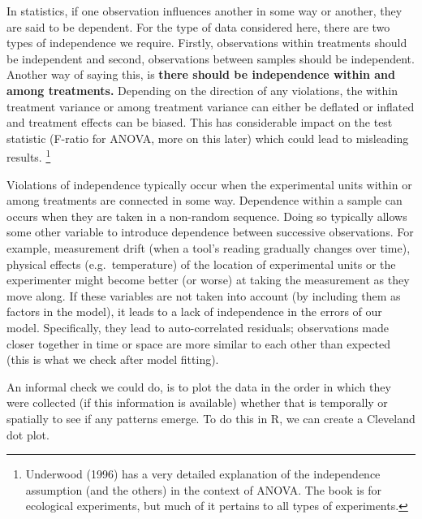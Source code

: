 \documentclass[
  letterpaper,
]{book}
\newenvironment{Shaded}{\begin{snugshade}}{\end{snugshade}}
\newcommand{\AttributeTok}[1]{\textcolor[rgb]{0.40,0.45,0.13}{#1}}
\newcommand{\FunctionTok}[1]{\textcolor[rgb]{0.28,0.35,0.67}{#1}}
\newcommand{\NormalTok}[1]{\textcolor[rgb]{0.00,0.23,0.31}{#1}}
\newcommand{\SpecialCharTok}[1]{\textcolor[rgb]{0.37,0.37,0.37}{#1}}
\newcommand{\StringTok}[1]{\textcolor[rgb]{0.13,0.47,0.30}{#1}}
\begin{document}
In statistics, if one observation influences another in some way or
another, they are said to be dependent. For the type of data considered
here, there are two types of independence we require. Firstly,
observations within treatments should be independent and second,
observations between samples should be independent. Another way of
saying this, is \textbf{there should be independence within and among
treatments.} Depending on the direction of any violations, the within
treatment variance or among treatment variance can either be deflated or
inflated and treatment effects can be biased. This has considerable
impact on the test statistic (F-ratio for ANOVA, more on this later)
which could lead to misleading results. \footnote{Underwood (1996) has a
  very detailed explanation of the independence assumption (and the
  others) in the context of ANOVA. The book is for ecological
  experiments, but much of it pertains to all types of experiments.}

Violations of independence typically occur when the experimental units
within or among treatments are connected in some way. Dependence within
a sample can occurs when they are taken in a non-random sequence. Doing
so typically allows some other variable to introduce dependence between
successive observations. For example, measurement drift (when a tool's
reading gradually changes over time), physical effects
(e.g.~temperature) of the location of experimental units or the
experimenter might become better (or worse) at taking the measurement as
they move along. If these variables are not taken into account (by
including them as factors in the model), it leads to a lack of
independence in the errors of our model. Specifically, they lead to
auto-correlated residuals; observations made closer together in time or
space are more similar to each other than expected (this is what we
check after model fitting).

An informal check we could do, is to plot the data in the order in which
they were collected (if this information is available) whether that is
temporally or spatially to see if any patterns emerge. To do this in R,
we can create a Cleveland dot plot.

\begin{Shaded}
\end{Shaded}
\end{document}
